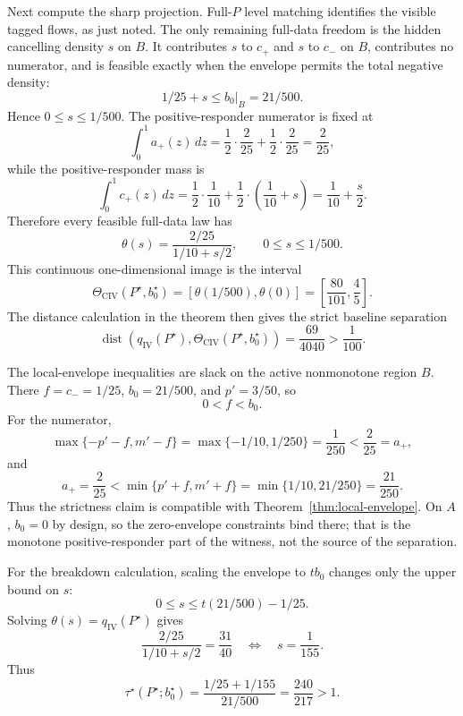 Next compute the sharp projection.  Full-\(P\) level matching identifies the
visible tagged flows, as just noted.  The only remaining full-data freedom is
the hidden cancelling density \(s\) on \(B\).  It contributes \(s\) to \(c_+\)
and \(s\) to \(c_-\) on \(B\), contributes no numerator, and is feasible
exactly when the envelope permits the total negative density:
\[
1/25+s\le b_0|_B=21/500.
\]
Hence \(0\le s\le1/500\).  The positive-responder numerator is fixed at
\[
\int_0^1a_+(z)\,dz
=
\frac12\cdot\frac2{25}+\frac12\cdot\frac2{25}
=\frac2{25},
\]
while the positive-responder mass is
\[
\int_0^1c_+(z)\,dz
=
\frac12\cdot\frac1{10}
+\frac12\cdot\left(\frac1{10}+s\right)
=
\frac1{10}+\frac{s}{2}.
\]
Therefore every feasible full-data law has
\[
\theta(s)=
\frac{2/25}{1/10+s/2},
\qquad 0\le s\le1/500.
\]
This continuous one-dimensional image is the interval
\[
\Theta_{\mathrm{CIV}}(P^\star,b_0^\star)
=
\left[
\theta(1/500),\theta(0)
\right]
=
\left[
\frac{80}{101},\frac45
\right].
\]
The distance calculation in the theorem then gives the strict baseline
separation
\[
\operatorname{dist}\!\left(q_{\mathrm{IV}}(P^\star),
\Theta_{\mathrm{CIV}}(P^\star,b_0^\star)\right)
=\frac{69}{4040}>\frac1{100}.
\]

The local-envelope inequalities are slack on the active nonmonotone region
\(B\).  There \(f=c_-=1/25\), \(b_0=21/500\), and \(p'=3/50\), so
\[
0<f<b_0.
\]
For the numerator,
\[
\max\{-p'-f,m'-f\}
=
\max\{-1/10,1/250\}
=\frac1{250}
<
\frac2{25}=a_+,
\]
and
\[
a_+=\frac2{25}
<
\min\{p'+f,m'+f\}
=
\min\{1/10,21/250\}
=\frac{21}{250}.
\]
Thus the strictness claim is compatible with Theorem~\ref{thm:local-envelope}.
On \(A\), \(b_0=0\) by design, so the zero-envelope constraints bind there;
that is the monotone positive-responder part of the witness, not the source of
the separation.

For the breakdown calculation, scaling the envelope to \(t b_0\) changes only
the upper bound on \(s\):
\[
0\le s\le t(21/500)-1/25.
\]
Solving \(\theta(s)=q_{\mathrm{IV}}(P^\star)\) gives
\[
\frac{2/25}{1/10+s/2}=\frac{31}{40}
\quad\Longleftrightarrow\quad
s=\frac1{155}.
\]
Thus
\[
\tau^\star(P^\star;b_0^\star)
=
\frac{1/25+1/155}{21/500}
=
\frac{240}{217}>1.
\]

